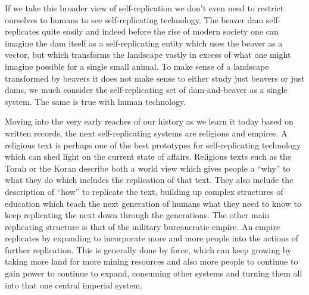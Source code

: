 If we take this broader view of self-replication we don't even need to
restrict ourselves to humans to see self-replicating technology. The
beaver dam self-replicates quite easily and indeed before the rise of
modern society one can imagine the dam itself as a self-replicating
entity which uses the beaver as a vector, but which transforms the
landscape vastly in excess of what one might imagine possible for a
single small animal. To make sense of a landscape transformed by beavers
it does not make sense to either study just beavers or just dams, we
much consider the self-replicating set of dam-and-beaver as a single
system. The same is true with human technology.

Moving into the very early reaches of our history as we learn it today
based on written records, the next self-replicating systems are
religions and empires. A religious text is perhaps one of the best
prototypes for self-replicating technology which can shed light on the
current state of affairs. Religious texts such as the Torah or the Koran
describe both a world view which gives people a ``why'' to what they do
which includes the replication of that text. They also include the
description of ``how'' to replicate the text, building up complex
structures of education which teach the next generation of humans what
they need to know to keep replicating the next down through the
generations. The other main replicating structure is that of the
military bureaucratic empire. An empire replicates by expanding to
incorporate more and more people into the actions of further
replication. This is generally done by force, which can keep growing by
taking more land for more mining resources and also more people to
continue to gain power to continue to expand, consuming other systems
and turning them all into that one central imperial system.

